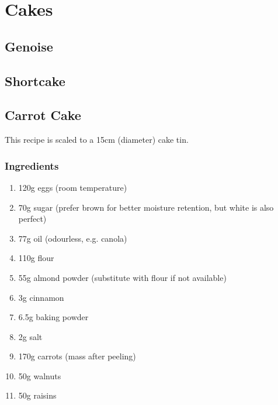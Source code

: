 \chapter{Cakes}
\section{Genoise}
\section{Shortcake}

\section{Carrot Cake}
This recipe is scaled to a 15cm (diameter) cake tin.

\subsection*{Ingredients}
\begin{enumerate}
  \item 120g eggs (room temperature)
  \item 70g sugar (prefer brown for better moisture retention, but white is also
  perfect)
  \item 77g oil (odourless, e.g. canola)
  \item 110g flour
  \item 55g almond powder (substitute with flour if not available)
  \item 3g cinnamon
  \item 6.5g baking powder
  \item 2g salt
  \item 170g carrots (mass after peeling)
  \item 50g walnuts
  \item 50g raisins
\end{enumerate}


